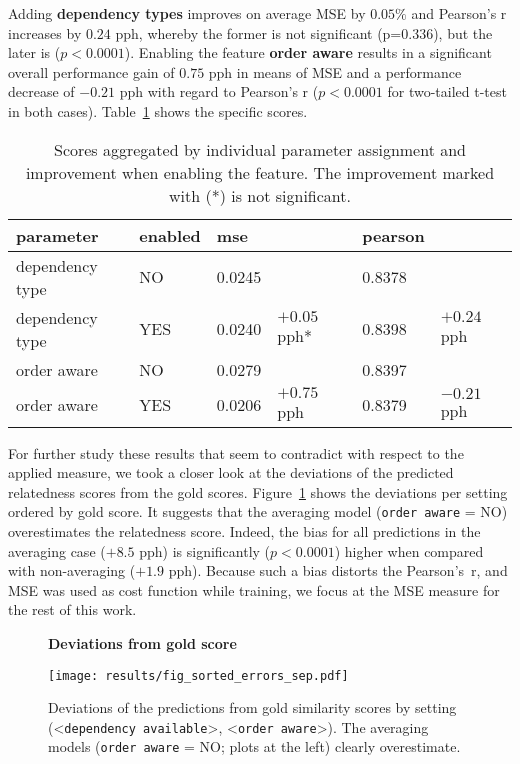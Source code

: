 Adding \textbf{dependency types} improves on average \ac{MSE} by $0.05\%$ and Pearson's r increases by $0.24$ pph, whereby the former is not significant (p=0.336), but the later is ($p<0.0001$). Enabling the feature \textbf{order aware} results in a significant overall performance gain of $0.75$ pph  in means of \ac{MSE} and a performance decrease of $-0.21$ pph with regard to Pearson's r ($p<0.0001$ for two-tailed t-test in both cases). Table~\ref{tab:results_merged} shows the specific scores.

\begin{table}[htb!]
	\centering
	\begin{tabularx}{\textwidth}{|p{} p{}|p{} X|p{} X|} 
		\hline
		parameter & enabled & mse & & pearson  & \\ \hline \hline
		dependency type & NO & 0.0245 & & 0.8378 & \\
		dependency type & YES & 0.0240 & $+0.05$ pph* & 0.8398 & $+0.24$ pph \\ \hline
		order aware & NO & 0.0279 &  & 0.8397 &  \\
		order aware & YES & 0.0206 & $+0.75$ pph & 0.8379 & $-0.21$ pph \\ \hline	   		
	\end{tabularx}
	\caption{Scores aggregated by individual parameter assignment and improvement when enabling the feature. The improvement marked with (*) is not significant.}
	\label{tab:results_merged}
\end{table}

For further study these results that seem to contradict with respect to the applied measure, we took a closer look at the deviations of the predicted relatedness scores from the gold scores. Figure~\ref{fig:fig_sorted_errors_sep} shows the deviations per setting ordered by gold score. It suggests that the averaging model (\texttt{order aware} = NO) overestimates the relatedness score. Indeed, the bias for all predictions in the averaging case ($+8.5$ pph) is significantly ($p < 0.0001$) higher when compared with non-averaging ($+1.9$ pph). Because such a bias distorts the Pearson's~r, and \ac{MSE} was used as cost function while training, we focus at the \ac{MSE} measure for the rest of this work.

\begin{figure}[htb!]
	\centering
	\textbf{Deviations from gold score}\par\medskip
	\texttt{[image: results/fig\_sorted\_errors\_sep.pdf]}
	\caption{Deviations of the predictions from gold similarity scores by setting (<\texttt{dependency available}>, <\texttt{order aware}>). The averaging models (\texttt{order aware} = NO; plots at the left) clearly overestimate.}
	\label{fig:fig_sorted_errors_sep}
\end{figure}

